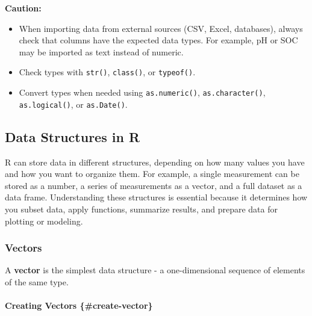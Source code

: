 \documentclass[
  10pt,
  b5paper,
  oneside]{book}
\begin{document}
\textbf{Caution:}

\begin{itemize}
\item
  When importing data from external sources (CSV, Excel, databases), always check that columns have the expected data types. For example, pH or SOC may be imported as text instead of numeric.
\item
  Check types with \texttt{str()}, \texttt{class()}, or \texttt{typeof()}.
\item
  Convert types when needed using \texttt{as.numeric()}, \texttt{as.character()}, \texttt{as.logical()}, or \texttt{as.Date()}.
\end{itemize}

\subsection{Data Structures in R}\label{structure-data}

R can store data in different structures, depending on how many values you have and how you want to organize them. For example, a single measurement can be stored as a number, a series of measurements as a vector, and a full dataset as a data frame. Understanding these structures is essential because it determines how you subset data, apply functions, summarize results, and prepare data for plotting or modeling.

\subsubsection{Vectors}\label{vector-data}

A \textbf{vector} is the simplest data structure - a one-dimensional sequence of elements of the same type.

\paragraph*{Creating Vectors \{\#create-vector\}}\label{creating-vectors-create-vector}
\end{document}
